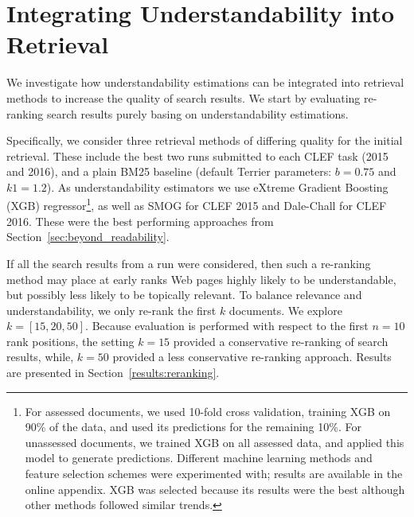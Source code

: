 \section{Integrating Understandability into Retrieval}
\label{sec:experiments}


We investigate how understandability estimations can be integrated into retrieval methods to increase the quality of search results. We start by evaluating re-ranking search results purely basing on understandability estimations. 

Specifically, we consider three retrieval methods of differing quality for the initial retrieval. These include the best two runs submitted to each CLEF task (2015 and 2016), and a plain BM25 baseline (default Terrier parameters: $b=0.75$ and $k1=1.2$). As understandability estimators we use eXtreme Gradient Boosting (XGB) regressor\footnote{For assessed documents, we used 10-fold cross validation, training XGB on 90\% of the data, and used its predictions for the remaining 10\%. For unassessed documents, we trained XGB on all assessed data, and applied this model to generate predictions. Different machine learning methods and feature selection schemes were experimented with; results are available in the online appendix. XGB was selected because its results were the best although other methods followed similar trends.}\cite{chen16}, as well as SMOG for CLEF 2015 and Dale-Chall for CLEF 2016. These were the best performing approaches from Section~\ref{sec:beyond_readability}.

If all the search results from a run were considered, then such a re-ranking method may place at early ranks Web pages highly likely to be understandable, but possibly less likely to be topically relevant. To balance relevance and understandability, we only re-rank the first $k$ documents. We explore $k = [15, 20, 50]$. Because evaluation is performed with respect to the first $n=10$ rank positions, the setting $k=15$ provided a conservative re-ranking of search results, while, $k=50$ provided a less conservative re-ranking approach. Results are presented in Section~\ref{results:reranking}.

